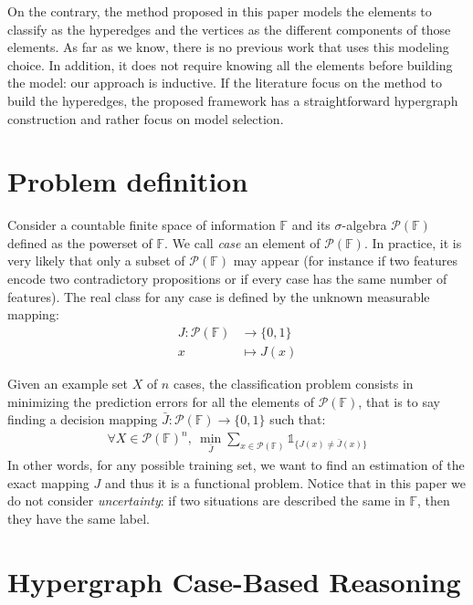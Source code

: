 \documentclass[sigconf,edbt]{acmart-edbt-workshops}
\begin{document}
On the contrary, the method proposed in this paper models the elements to classify as the hyperedges and the vertices as the different components of those elements. As far as we know, there is no previous work that uses this modeling choice. In addition, it does not require knowing all the elements before building the model: our approach is inductive. If the literature focus on the method to build the hyperedges, the proposed framework has a straightforward hypergraph construction and rather focus on model selection.

\section{Problem definition}
\label{sec:problem}

Consider a countable finite space of information $\mathbb{F}$ and its $\sigma$-algebra $\mathcal P({\mathbb F})$ defined as the powerset of $\mathbb F$. We call {\it case} an element of $\mathcal P({\mathbb F})$. In practice, it is very likely that only a subset of $\mathcal P({\mathbb F})$ may appear (for instance if two features encode two contradictory propositions or if every case has the same number of features). The real class for any case is defined by the unknown measurable mapping:
\begin{align*}
   J \colon \mathcal P({\mathbb F}) & \to \{0,1 \} \\
   x &\mapsto J(x)
\end{align*}

Given an example set $X$ of $n$ cases, the classification problem consists in minimizing the prediction errors for all the elements of $\mathcal P({\mathbb F})$, that is to say finding a decision mapping $\bar J \colon \mathcal P({\mathbb F}) \to \{0,1 \}$ such that:
\begin{align}
\label{eq:pb} 
 \forall X \in \mathcal P({\mathbb F})^n, ~ \underset{\bar J}{\min} \sum_{x \in \mathcal P({\mathbb F})} \mathds{1}_{\{J(x) \neq \bar J(x)\}}
\end{align}
In other words, for any possible training set, we want to find an estimation of the exact mapping $J$ and thus it is a functional problem.
Notice that in this paper we do not consider {\it uncertainty}: if two situations are described the same in $\mathbb{F}$, then they have the same label.

\section{Hypergraph Case-Based Reasoning}
\label{sec:model}
\end{document}
